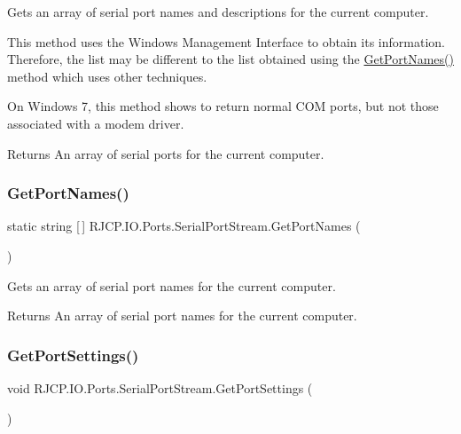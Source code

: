 Gets an array of serial port names and descriptions for the current computer. 

This method uses the Windows Management Interface to obtain its information. Therefore, the list may be different to the list obtained using the \mbox{\hyperlink{class_r_j_c_p_1_1_i_o_1_1_ports_1_1_serial_port_stream_a2f188e6437adb4c64ce434f7b0c5e4ef}{Get\+Port\+Names()}} method which uses other techniques. 

On Windows 7, this method shows to return normal C\+OM ports, but not those associated with a modem driver.

\begin{DoxyReturn}{Returns}
An array of serial ports for the current computer.
\end{DoxyReturn}
\mbox{\label{class_r_j_c_p_1_1_i_o_1_1_ports_1_1_serial_port_stream_a2f188e6437adb4c64ce434f7b0c5e4ef}} 
\subsubsection{\texorpdfstring{GetPortNames()}{GetPortNames()}}
{\footnotesize\ttfamily static string \mbox{[}$\,$\mbox{]} R\+J\+C\+P.\+I\+O.\+Ports.\+Serial\+Port\+Stream.\+Get\+Port\+Names (\begin{DoxyParamCaption}{ }\end{DoxyParamCaption})\hspace{0.3cm}{\ttfamily [static]}}



Gets an array of serial port names for the current computer. 

\begin{DoxyReturn}{Returns}
An array of serial port names for the current computer.
\end{DoxyReturn}
\mbox{\label{class_r_j_c_p_1_1_i_o_1_1_ports_1_1_serial_port_stream_ab46149075be4eb8bc5d914439757d43e}} 
\subsubsection{\texorpdfstring{GetPortSettings()}{GetPortSettings()}}
{\footnotesize\ttfamily void R\+J\+C\+P.\+I\+O.\+Ports.\+Serial\+Port\+Stream.\+Get\+Port\+Settings (\begin{DoxyParamCaption}{ }\end{DoxyParamCaption})}



